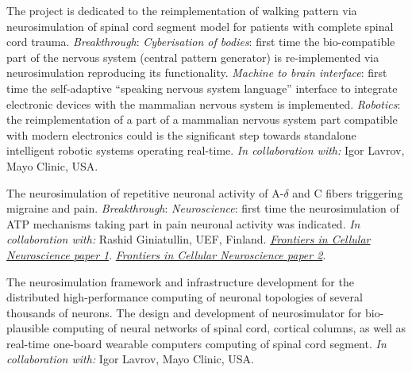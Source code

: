 \documentclass{moderncv}
\begin{document}
       {\small The project is dedicated to the reimplementation of walking pattern via neurosimulation of spinal cord segment model for patients with complete spinal cord trauma.
  \emph{Breakthrough}:
  \emph{Cyberisation of bodies}: first time the bio-compatible part of the nervous system (central pattern generator) is re-implemented via neurosimulation reproducing its functionality.
  \emph{Machine to brain interface}: first time the self-adaptive ``speaking nervous system language'' interface to integrate electronic devices with the mammalian nervous system is implemented.
  \emph{Robotics}: the reimplementation of a part of a mammalian nervous system part compatible with modern electronics could is the significant step towards standalone intelligent robotic systems operating real-time.
\emph{In collaboration with:} Igor Lavrov, Mayo Clinic, USA.}

       {\small The neurosimulation of repetitive neuronal activity of A-$\delta$ and C fibers triggering migraine and pain.
  \emph{Breakthrough}:
  \emph{Neuroscience}: first time the neurosimulation of ATP mechanisms taking part in pain neuronal activity was indicated.
  \emph{In collaboration with:} Rashid Giniatullin, UEF, Finland.
  \href{https://www.frontiersin.org/articles/10.3389/fncel.2020.00135/full}{\emph{Frontiers in Cellular Neuroscience paper 1}}.
  \href{https://www.frontiersin.org/articles/10.3389/fncel.2021.644047/full}{\emph{Frontiers in Cellular Neuroscience paper 2}}.
}

       {\small The neurosimulation framework and infrastructure development for the distributed high-performance computing of neuronal topologies of several thousands of neurons.
  The design and development of neurosimulator for bio-plausible computing of neural networks of spinal cord, cortical columns, as well as real-time one-board wearable computers computing of spinal cord segment.
  \emph{In collaboration with:} Igor Lavrov, Mayo Clinic, USA.
}
       
\end{document}
